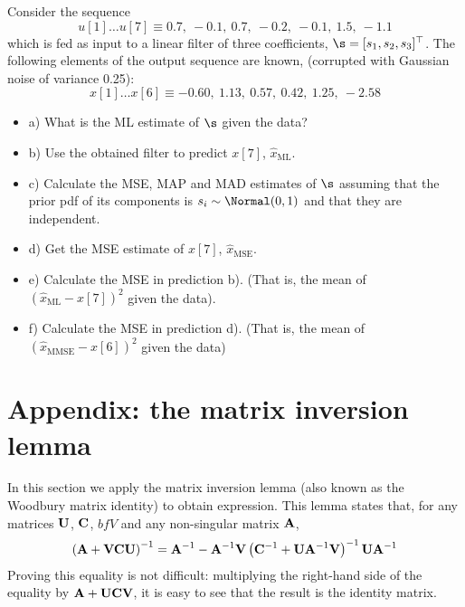 \begin{prob}
\label{ProbFiltrado}

Consider the sequence
$$
u[1] \ldots u[7] \equiv 0.7,~-0.1,~0.7,~-0.2,~-0.1,~1.5,~-1.1
$$
which is fed as input to a linear filter of three coefficients, $\s = [s_1, s_2, s_3]^\top$. The following elements of the output sequence are known, (corrupted with Gaussian noise of variance 0.25):
$$
x[1] \ldots x[6] \equiv  -0.60,~1.13,~0.57,~0.42,~1.25,~-2.58
$$

\begin {itemize}
\item [a)] What is the ML estimate of $\s$ given the data? %
\item [b)] Use the obtained filter to predict $x[7]$, $\hat{x}_\text{ML}$.
\item [c)] Calculate the MSE, MAP and MAD estimates of $\s$ assuming that the prior pdf of its components is $s_i \sim \Normal(0,1)$ and that they are independent.
\item [d)] Get the MSE estimate of $x[7]$, $\hat{x}_\text{MSE}$.
\item [e)] Calculate the MSE in prediction b). (That is, the mean of $ (\hat{x}_\text{ML} -x[7])^2$ given the data).
\item [f)] Calculate the MSE in prediction d). (That is, the mean of $(\hat{x}_\text{MMSE} -x[6])^2 $ given the data)
\end{itemize}

\end{prob}


\section{Appendix: the matrix inversion lemma}
\label{Sec:mil}

In this section we apply the matrix inversion lemma (also known as the Woodbury matrix identity) to obtain expression. This lemma states that, for any matrices ${\bf U}$, ${\bf C}$, ${bf V}$ and any non-singular matrix ${\bf A}$, 
\begin{align}
\left({\bf A} + {\bf V}{\bf C}{\bf U} \right)^{-1}
    = {\bf A}^{-1} 
    - {\bf A}^{-1}{\bf V} \left({\bf C}^{-1} 
    + {\bf U}{\bf A}^{-1}{\bf V} \right)^{-1} {\bf U}{\bf A}^{-1}
\end{align}
Proving this equality is not difficult: multiplying the right-hand side of the equality by ${\bf A} + {\bf U}{\bf C}{\bf V}$, it is easy to see that the result is the identity matrix.

